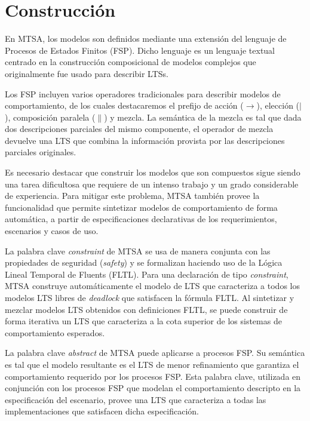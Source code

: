 \section{Construcción}

En MTSA, los modelos son definidos mediante una extensión del lenguaje de Procesos de Estados Finitos (FSP). Dicho
lenguaje es un lenguaje textual centrado en la construcción composicional de modelos complejos que originalmente fue
usado para describir LTSs.

Los FSP incluyen varios operadores tradicionales para describir modelos de comportamiento, de los cuales destacaremos el
prefijo de acción ($\rightarrow$), elección ($|$), composición paralela ($\|$) y mezcla.
La semántica de la mezcla es tal que dada dos descripciones parciales del mismo componente, el operador de mezcla
devuelve una LTS que combina la información provista por las descripciones parciales originales.

Es necesario destacar que construir los modelos que son compuestos sigue siendo una tarea dificultosa que requiere de un
intenso trabajo y un grado considerable de experiencia. Para mitigar este problema, MTSA también provee la funcionalidad
que permite sintetizar modelos de comportamiento de forma automática, a partir de especificaciones declarativas de los
requerimientos, escenarios y casos de uso.

La palabra clave \emph{constraint} de MTSA se usa de manera conjunta con las propiedades de seguridad (\emph{safety}) y
se formalizan haciendo uso de la Lógica Lineal Temporal de Fluents (FLTL). Para una declaración de tipo \emph{constraint},
MTSA construye automáticamente el modelo de LTS que caracteriza a todos los modelos LTS libres de \emph{deadlock} que
satisfacen la fórmula FLTL. Al sintetizar y mezclar modelos LTS obtenidos con definiciones FLTL, se puede construir de
forma iterativa un LTS que caracteriza a la cota superior de los sistemas de comportamiento esperados.

La palabra clave \emph{abstract} de MTSA puede aplicarse a procesos FSP. Su semántica es tal que el modelo resultante es
el LTS de menor refinamiento que garantiza el comportamiento requerido por los procesos FSP. Esta palabra clave,
utilizada en conjunción con los procesos FSP que modelan el comportamiento descripto en la especificación del escenario,
provee una LTS que caracteriza a todas las implementaciones que satisfacen dicha especificación.
